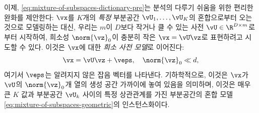 \documentclass[../../book-main_ko.tex]{subfiles}
\begin{document}
이제, \eqref{eq:mixture-of-subspaces-dictionary-pre}는 분석의 다루기 쉬움을 위한 편리한 완화를 제안한다: \(\vx\)를 \(K\)개의 \textit{특정} 부분공간 \(\vU_1, \dots, \vU_K\)의 혼합으로부터 오는 것으로 모델링하는 대신, 우리는 \(m\)이 \(D\)보다 작거나 클 수 있는 사전 \(\vU \in \R^{D \times m}\)로부터 시작하여, 희소성 \(\norm{\vz}_0\)이 충분히 작은 \(\vx = \vU \vz\)로 표현하려고 시도할 수 있다.
이것은 \(\vx\)에 대한 \textit{희소 사전 모델}로 이어진다:
\begin{equation}\label{eq:mixture-of-subspaces-dictionary}
    \vx =  \vU \vz + \veps,
    \quad
    \norm{\vz}_0 \ll d,
\end{equation}
여기서 \(\veps\)는 알려지지 않은 잡음 벡터를 나타낸다.
기하학적으로, 이것은 \(\vx\)가 \(\vU\)의 \(\norm{\vz}_0\)개 열의 생성 공간 가까이에 놓여 있음을 의미하며,
이것은 매우 큰 \(K\) 값과 부분공간 \(\vU_k\) 사이의 특정 상관관계를 가진 부분공간의 혼합 모델 \eqref{eq:mixture-of-subspaces-geometric}의 인스턴스화이다.
\end{document}
